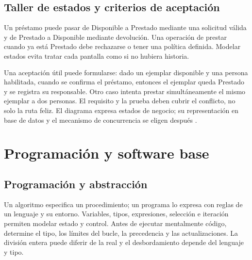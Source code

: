 \subsection{Taller de estados y criterios de aceptación}
Un préstamo puede pasar de Disponible a Prestado mediante una solicitud válida y de Prestado a Disponible mediante devolución. Una operación de prestar cuando ya está Prestado debe rechazarse o tener una política definida. Modelar estados evita tratar cada pantalla como si no hubiera historia.
\begin{center}
\end{center}
Una aceptación útil puede formularse: dado un ejemplar disponible y una persona habilitada, cuando se confirma el préstamo, entonces el ejemplar queda Prestado y se registra su responsable. Otro caso intenta prestar simultáneamente el mismo ejemplar a dos personas. El requisito y la prueba deben cubrir el conflicto, no solo la ruta feliz. El diagrama expresa estados de negocio; su representación en base de datos y el mecanismo de concurrencia se eligen después \cite{swebok,postgres}.


\section{Programación y software base}\label{sec:s2}
\subsection{Programación y abstracción}
Un algoritmo especifica un procedimiento; un programa lo expresa con reglas de un lenguaje y su entorno. Variables, tipos, expresiones, selección e iteración permiten modelar estado y control. Antes de ejecutar mentalmente código, determine el tipo, los límites del bucle, la precedencia y las actualizaciones. La división entera puede diferir de la real y el desbordamiento depende del lenguaje y tipo.

